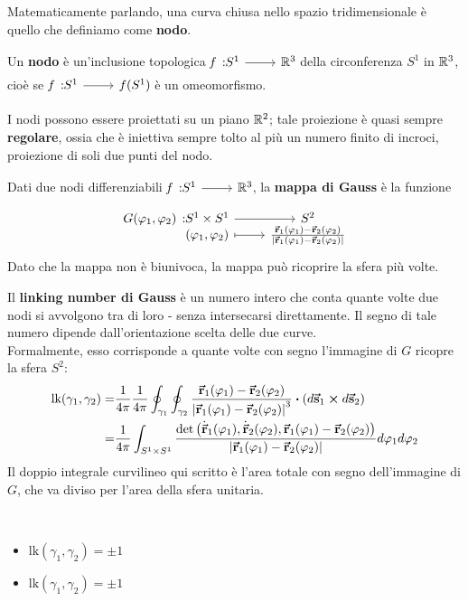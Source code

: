 Matematicamente parlando, una curva chiusa nello spazio tridimensionale è quello che definiamo come \textbf{nodo}.
\begin{define}[Nodo]
	Un \textbf{nodo} è un'inclusione topologica $\funz[f]{S^1}{\realset^3}$ della circonferenza $S^1$ in $\mathbb{R}^3$, cioè se $\funz[f]{S^1}{f(S^1)}$ è un omeomorfismo.
\end{define}
I nodi possono essere proiettati su un piano $\mathbb{R}^2$; tale proiezione è quasi sempre \textbf{regolare}, ossia che è iniettiva sempre tolto al più un numero finito di incroci, proiezione di soli due punti del nodo.
\begin{define}
	Dati due nodi differenziabili $\funz[f]{S^1}{\realset^3}$, la \textbf{mappa di Gauss} è la funzione
	\begin{equation}
		\funztot[G(\phi_1,\phi_2)]{S^1\times S^1}{S^2}{\left(\phi_1,\phi_2\right)}{\frac{\vba{r}_1(\phi_1) - \vba{r}_2 (\phi_2)}{\abs{\vba{r}_1(\phi_1) - \vba{r}_2(\phi_2)}}}
	\end{equation}
	Dato che la mappa non è biunivoca, la mappa può ricoprire la sfera più volte.
\end{define}
\begin{define}
	Il \textbf{linking number di Gauss} è un numero intero che conta quante volte due nodi si avvolgono tra di loro - senza intersecarsi direttamente. Il segno di tale numero dipende dall'orientazione scelta delle due curve.\\
	Formalmente, esso corrisponde a quante volte con segno l'immagine di $G$ ricopre la sfera $S^2$:
	\begin{align}
		\textrm{lk}(\gamma_1,\gamma_2)=&\frac{1}{4\pi}\frac{1}{4\pi}\oint_{\gamma_1} \oint_{\gamma_2} \frac{\vba{r}_1(\phi_1) - \vba{r}_2 (\phi_2)}{\abs{\vba{r}_1(\phi_1) - \vba{r}_2(\phi_2)}^3} \vdot \left(d\vba{s}_1\cross d\vba{s}_2\right)\\
		=&\frac{1}{4\pi}\int_{S^1\times S^1}\frac{\det\left(\vbd{r}_1(\phi_1),\vbd{r}_2(\phi_2),\vba{r}_1(\phi_1)-\vba{r}_2(\phi_2)\right)}{\abs{\vba{r}_1(\phi_1) - \vba{r}_2(\phi_2)}}d\phi_1d\phi_2
	\end{align}
	Il doppio integrale curvilineo qui scritto è l'area totale con segno dell'immagine di $G$, che va diviso per l'area della sfera unitaria.
\end{define}
\begin{example}~
	\begin{itemize}
		\item $\textrm{lk}(\gamma_1,\gamma_2)=\pm 1$ %
		\item $\textrm{lk}(\gamma_1,\gamma_2)=\pm 1$ %
	\end{itemize}
\end{example}
